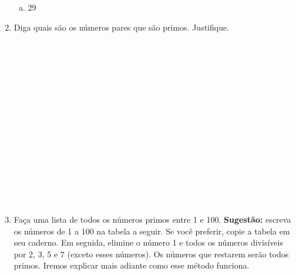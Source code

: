 \documentclass[a4paper,14pt]{article}
\begin{document}
\begin{multicols}{2}
\begin{enumerate}
\begin{enumerate}[a)]
				\item 29
			\end{enumerate}
			\item Diga quais são os números pares que são primos. Justifique. \\\\\\\\\\\\\\\\\\\\\\\\\\\\\\\\
			\item Faça uma lista de todos os números primos entre 1 e 100. \textbf{Sugestão:} escreva os números de 1 a 100 na tabela a seguir. Se você preferir, copie a tabela em seu caderno. Em seguida, elimine o número 1 e todos os números divisíveis por 2, 3, 5 e 7 (exceto esses números). Os números que restarem serão todos primos. Iremos explicar mais adiante como esse método funciona. \\
			\begin{table}[H]
				\centering
\end{table}
\end{enumerate}
\end{multicols}
\end{document}
